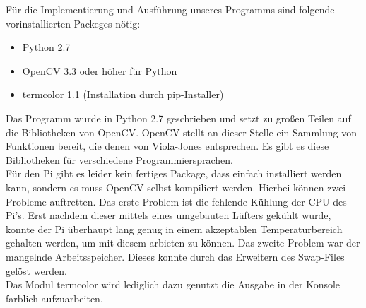 Für die Implementierung und Ausführung unseres Programms sind folgende vorinstallierten Packeges nötig:

\begin{itemize}
\item Python 2.7
\item OpenCV 3.3 oder höher für Python
\item termcolor 1.1 (Installation durch pip-Installer)
\end{itemize}


Das Programm wurde in Python 2.7 geschrieben und setzt zu großen Teilen auf die Bibliotheken von OpenCV\cite{opencv}. OpenCV stellt an dieser Stelle ein Sammlung von Funktionen bereit, die denen von Viola-Jones entsprechen. Es gibt es diese Bibliotheken für verschiedene Programmiersprachen.
\\
Für den Pi gibt es leider kein fertiges Package, dass einfach installiert werden kann, sondern es muss OpenCV selbst kompiliert werden. Hierbei können zwei Probleme auftretten. Das erste Problem ist die fehlende Kühlung der CPU des Pi's. Erst nachdem dieser mittels eines umgebauten Lüfters gekühlt wurde, konnte der Pi überhaupt lang genug in einem akzeptablen Temperaturbereich gehalten werden, um mit diesem arbieten zu können. Das zweite Problem war der mangelnde Arbeitsspeicher. Dieses konnte durch das Erweitern des Swap-Files gelöst werden.
\\
Das Modul termcolor wird lediglich dazu genutzt die Ausgabe in der Konsole farblich aufzuarbeiten.

